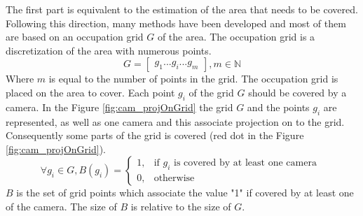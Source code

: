 
The first part is equivalent to the estimation of the area that needs to be covered. Following this direction, many methods have been developed and most of them are based on an occupation grid $G$ of the area. The occupation grid is a discretization of the area with numerous points.
\begin{equation}\label{eq:Grid}
	G=\begin{bmatrix}
	 	g_1 ...g_i ... g_m
	\end{bmatrix}  , m\in \mathbb{N}
\end{equation}
Where $m$ is equal to the number of points in the grid.
The occupation grid is placed on the area to cover. Each point $g_i$ of the grid $G$ should be covered by a camera. In the Figure \ref{fig:cam_projOnGrid} the grid $G$ and the points $g_i$ are represented, as well as one camera and this associate projection on to the grid.
 Consequently some parts of the grid is covered (red dot in the Figure \ref{fig:cam_projOnGrid}). 
\begin{equation}\label{eq:B}
\forall g_i \in G, B(g_i)= \begin{cases} 1, & \mbox{if } g_i \mbox{ is covered by at least one camera }\\ 0, & \mbox{otherwise}   \end{cases}
\end{equation}
$B$ is the set of grid points which associate the value  "1"  if covered by at least one of the camera. The size of $B$ is relative to the size of $G$.
